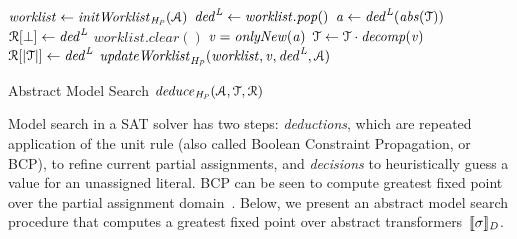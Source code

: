 \begin{algorithm2e}[t]
\DontPrintSemicolon
{}
\begin{small}
$\mathit{worklist} \leftarrow \mathit{initWorklist}_{\mathit{H_P}}(\mathcal{A})$ \;
{
  $\mathit{ded}^{\mathit{L}} \leftarrow \mathit{worklist.pop}()$ \; 
  $\mathit{a} \leftarrow \mathit{ded}^{\mathit{L}}(\mathit{abs}(\mathcal{T}))$\;
  \uIf{$\absval = \bot$} {
    $\mathcal{R}[\bot] \leftarrow \mathit{ded}^{\mathit{L}}$ \;
    $\mathit{worklist.clear}()$ \;
    \return \conflict \;
  }
  \uElse
  {
    $\mathit{v}=\mathit{onlyNew}(\mathit{a})$\;
    $\mathcal{T} \leftarrow \mathcal{T} \cdot {\mathit{decomp}}(\mathit{v})$ \; 
    $\mathcal{R}[|\mathcal{T}|] \leftarrow \mathit{ded}^{\mathit{L}}$ \;
    $\mathit{updateWorklist}_{\mathit{H_P}}(\mathit{worklist}, \mathit{v}, \mathit{ded}^{\mathit{L}},  \mathcal{A})$ \; 
  }
}
 {
  \return \sat
}
 \return \unknown \;

\end{small}
\caption{Abstract Model Search $\mathit{deduce}_{\mathit{H_P}}(\mathcal{A},\mathcal{T},\mathcal{R})$ \label{Alg:ms}}
\end{algorithm2e}

Model search in a SAT solver has two steps: {\em deductions}, which are
repeated application of the unit rule (also called Boolean Constraint
Propagation, or BCP), to refine current partial assignments, and {\em
decisions} to heuristically guess a value for an unassigned literal.  BCP
can be seen to compute greatest fixed point over the partial assignment
domain~\cite{dhk2013-popl}.  Below, we present an abstract model search
procedure that computes a greatest fixed point over abstract
transformers~$\llbracket \sigma \rrbracket_{\mathit{D}}$.
 
%

